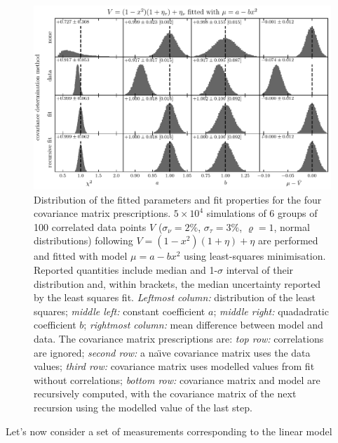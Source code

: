 \documentclass[a4paper,fleqn,usenatbib]{mnras}
\def\norm{_\tau}
\def\meas{_\nu}
\def\data{\ensuremath{{\scriptstyle V}}}
\def\mod{\ensuremath{\mu}}
\def\error{\ensuremath{\eta}}
\def\dev{\ensuremath{\sigma}}
\def\reldev{\ensuremath{\dev\norm}}
\def\absdev{\ensuremath{\dev\meas}}
\def\corr{\ensuremath{\varrho}}
\begin{document}
\begin{figure}
\centering
\includegraphics[width=\linewidth]{pdf/fit-quality.pdf}
\caption{Distribution of the fitted parameters and fit properties for the four covariance matrix prescriptions. $5\times10^4$ simulations of 6 groups of 100 correlated data points $\data$ ($\absdev = 2\%$, $\reldev = 3\%$, $\corr = 1$, normal distributions) following $\data = (1-x^2)(1 + \error)+\error$ are performed and fitted with model $\mod = a - bx^2$ using least-squares minimisation. Reported quantities include median and 1-$\sigma$ interval of their distribution and, within brackets, the median uncertainty reported by the least squares fit. \emph{Leftmost column:} distribution of the least squares; \emph{middle left:} constant coefficient $a$; \emph{middle right:} quadadratic coefficient $b$; \emph{rightmost column:} mean difference between model and data. The covariance matrix prescriptions are: \emph{top row:} correlations are ignored; \emph{second row:} a na\"\i{}ve covariance matrix uses the data values; \emph{third row:} covariance matrix uses modelled values from fit without correlations; \emph{bottom row:} covariance matrix and model are recursively computed, with the covariance matrix of the next recursion using the modelled value of the last step.}
\label{fig:fitanalysis}
\end{figure}

Let's now consider a set of measurements corresponding to the linear model 
\end{document}
